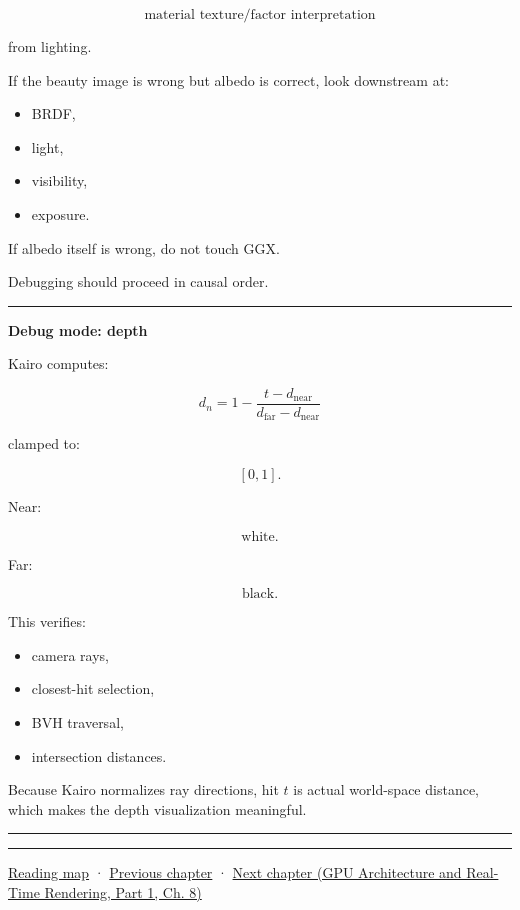 \[
\text{material texture/factor interpretation}
\]

from lighting.

If the beauty image is wrong but albedo is correct, look downstream at:

\begin{itemize}
\tightlist
\item
  BRDF,
\item
  light,
\item
  visibility,
\item
  exposure.
\end{itemize}

If albedo itself is wrong, do not touch GGX.

Debugging should proceed in causal order.

\begin{center}\rule{0.5\linewidth}{0.5pt}\end{center}

\textbf{Debug mode: depth}

Kairo computes:

\[
d_n
=
1-
\frac{
t-d_{\text{near}}
}{
d_{\text{far}}-d_{\text{near}}
}
\]

clamped to:

\[
[0,1].
\]

Near:

\[
\text{white}.
\]

Far:

\[
\text{black}.
\]

This verifies:

\begin{itemize}
\tightlist
\item
  camera rays,
\item
  closest-hit selection,
\item
  BVH traversal,
\item
  intersection distances.
\end{itemize}

Because Kairo normalizes ray directions, hit \(t\) is actual world-space distance, which makes the depth visualization meaningful.

\begin{center}\rule{0.5\linewidth}{0.5pt}\end{center}

\begin{center}\rule{0.5\linewidth}{0.5pt}\end{center}

\hyperref[volume-reading-map]{Reading map} · \hyperref[03-visual-computing-i-ch009-point-lights-mis-and-environment-lighting]{Previous chapter} · \href{../06-GPU-Architecture-and-Real-Time-Rendering-P01/main.pdf\#nameddest=03-visual-computing-i-ch011-bvh-traversal-and-deterministic-evidence}{Next chapter (GPU Architecture and Real-Time Rendering, Part 1, Ch. 8)}
